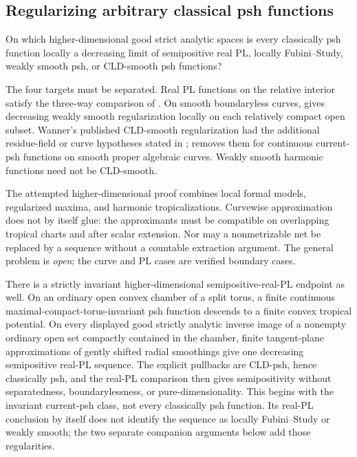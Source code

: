 \subsection{Regularizing arbitrary classical psh functions}
\label{sec:ch72-classical-regularization}

\begin{problem}\label{prob:frontier-classical-regularization}
On which higher-dimensional good strict analytic spaces is every classically
psh function locally a decreasing limit of semipositive real PL, locally
Fubini--Study, weakly smooth psh, or CLD-smooth psh functions?
\end{problem}

The four targets must be separated.  Real PL functions on the relative
interior satisfy the three-way comparison of
.  On smooth boundaryless curves,
\cite[Proposition~15.11]{GJR26} gives decreasing weakly smooth
regularization locally on each relatively compact open subset.  Wanner's
published CLD-smooth regularization had the additional residue-field or curve
hypotheses stated in \cite[Corollary~5.4]{Wanner19};
 removes them for
continuous current-psh functions on smooth proper algebraic curves.
Weakly smooth harmonic functions need not be CLD-smooth.

The attempted higher-dimensional proof combines local formal models,
regularized maxima, and harmonic tropicalizations.  Curvewise approximation
does not by itself glue: the approximants must be compatible on overlapping
tropical charts and after scalar extension.  Nor may a nonmetrizable net be
replaced by a sequence without a countable extraction argument.  The general
problem is \emph{open}; the curve and PL cases are verified boundary cases.

There is a strictly invariant higher-dimensional semipositive-real-PL
endpoint as well.  On an ordinary open convex chamber of a split torus, a
finite continuous maximal-compact-torus-invariant psh function descends to a
finite convex tropical potential.  On every displayed good strictly analytic
inverse image of a nonempty ordinary open set compactly contained in the
chamber, finite tangent-plane approximations of gently shifted
radial smoothings give one decreasing semipositive real-PL sequence.  The
explicit pullbacks are CLD-psh, hence classically psh, and the real-PL
comparison then gives semipositivity without separatedness, boundarylessness,
or pure-dimensionality.  This begins with the invariant current-psh class,
not every classically psh function.  Its real-PL conclusion by itself does
not identify the sequence as locally Fubini--Study or weakly smooth; the two
separate companion arguments below add those regularities.



